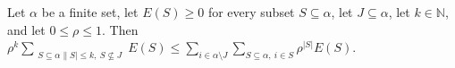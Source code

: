 \begin{theorem}
\leanok
{}
Let $\alpha$ be a finite set, let $E(S)\ge 0$ for every subset $S\subseteq\alpha$, let
$J\subseteq\alpha$, let $k\in\mathbb N$, and let $0\le\rho\le 1$. Then
$\rho^k\sum_{\substack{S\subseteq\alpha\|S|\le k,\ S\nsubseteq
J}}E(S)\le\sum_{i\in\alpha\setminus J}\sum_{S\subseteq\alpha,\ i\in S}\rho^{|S|}E(S)$.
\end{theorem}
